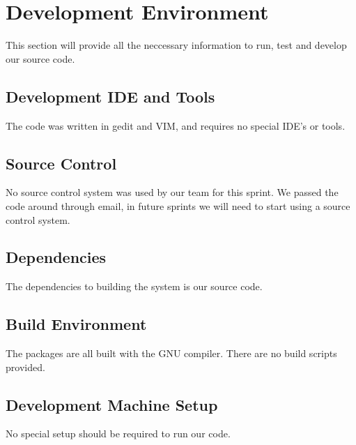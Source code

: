 \chapter{Development Environment}
This section will provide all the neccessary information to run, test and develop 
our source code.


\section{Development IDE and Tools}
The code was written in gedit and VIM, and requires no special IDE's or tools.

\section{Source  Control}
No source control system was used by our team for this sprint. We passed the code 
around through email, in future sprints we will need to start using a source control system.

\section{Dependencies}
The dependencies to building the system is our source code. 

\section{Build  Environment}
The packages are all built with the GNU compiler. There are no build scripts provided. 

\section{Development Machine Setup}
No special setup should be required to run our code.

